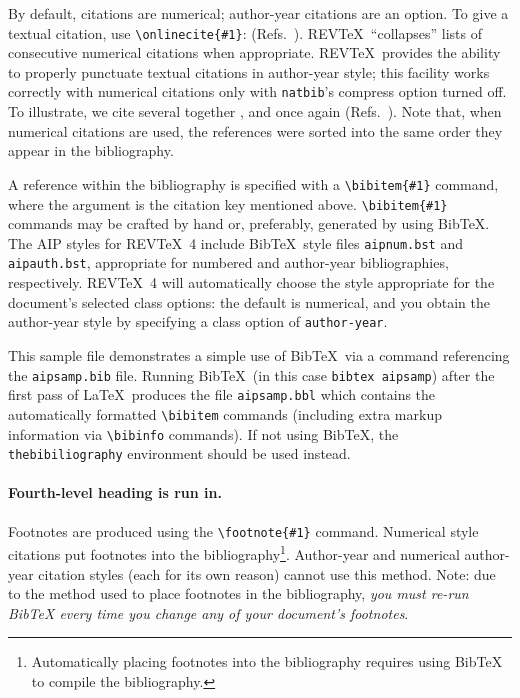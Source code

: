 \documentclass[%
 aip,
 amsmath,amssymb,
preprint,%
]{revtex4-1}
\begin{document}
By default, citations are numerical; \cite{feyn54} author-year citations are an option. 
To give a textual citation, use \verb+\onlinecite{#1}+: (Refs.~). 
REV\TeX\ ``collapses'' lists of consecutive numerical citations when appropriate. 
REV\TeX\ provides the ability to properly punctuate textual citations in author-year style;
this facility works correctly with numerical citations only with \texttt{natbib}'s compress option turned off. 
To illustrate, we cite several together \cite{feyn54,witten2001,epr,Berman1983}, 
and once again (Refs.~). 
Note that, when numerical citations are used, the references were sorted into the same order they appear in the bibliography. 

A reference within the bibliography is specified with a \verb+\bibitem{#1}+ command,
where the argument is the citation key mentioned above. 
\verb+\bibitem{#1}+ commands may be crafted by hand or, preferably,
generated by using Bib\TeX. 
The AIP styles for REV\TeX~4 include Bib\TeX\ style files
\verb+aipnum.bst+ and \verb+aipauth.bst+, appropriate for
numbered and author-year bibliographies,
respectively. 
REV\TeX~4 will automatically choose the style appropriate for 
the document's selected class options: the default is numerical, and
you obtain the author-year style by specifying a class option of \verb+author-year+.

This sample file demonstrates a simple use of Bib\TeX\ 
via a \verb++ command referencing the \verb+aipsamp.bib+ file.
Running Bib\TeX\ (in this case \texttt{bibtex
aipsamp}) after the first pass of \LaTeX\ produces the file
\verb+aipsamp.bbl+ which contains the automatically formatted
\verb+\bibitem+ commands (including extra markup information via
\verb+\bibinfo+ commands). If not using Bib\TeX, the
\verb+thebibiliography+ environment should be used instead.

\paragraph{Fourth-level heading is run in.}%
Footnotes are produced using the \verb+\footnote{#1}+ command. 
Numerical style citations put footnotes into the 
bibliography\footnote{Automatically placing footnotes into the bibliography requires using BibTeX to compile the bibliography.}.
Author-year and numerical author-year citation styles (each for its own reason) cannot use this method. 
Note: due to the method used to place footnotes in the bibliography, \emph{you
must re-run BibTeX every time you change any of your document's
footnotes}. 
\end{document}
